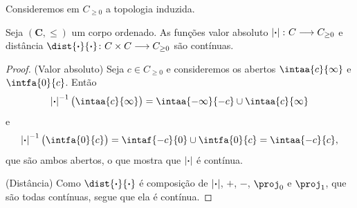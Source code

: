 %


Consideremos em $C_{\geq 0}$ a topologia induzida.

\begin{prop}
Seja $(\bm C,\leq)$ um corpo ordenado. As funções valor absoluto $\left\vert{\bm{\cdot}}\right\vert\colon C \longrightarrow C_{\geq 0}$ e distância $\dist{\var}{\var}\colon C \times C \to C_{\geq 0}$ são contínuas.
\end{prop}
\begin{proof}
(Valor absoluto) Seja $c \in C_{\geq 0}$ e consideremos os abertos $\intaa{c}{\infty}$ e $\intfa{0}{c}$. Então
	\begin{equation*}
	\abs{\var}\inv \big( \intaa{c}{\infty} \big) = \intaa{-\infty}{-c} \cup \intaa{c}{\infty}
	\end{equation*}
e
	\begin{equation*}
	\abs{\var}\inv \big( \intfa{0}{c} \big) = \intaf{-c}{0} \cup \intfa{0}{c} = \intaa{-c}{c},
	\end{equation*}
que são ambos abertos, o que mostra que $\left\vert{\bm{\cdot}}\right\vert$ é contínua.

(Distância) Como $\dist{\var}{\var}$ é composição de $\left\vert{\bm{\cdot}}\right\vert$, $+$, $-$, $\proj_0$ e $\proj_1$, que são todas contínuas, segue que ela é contínua.
\end{proof}





